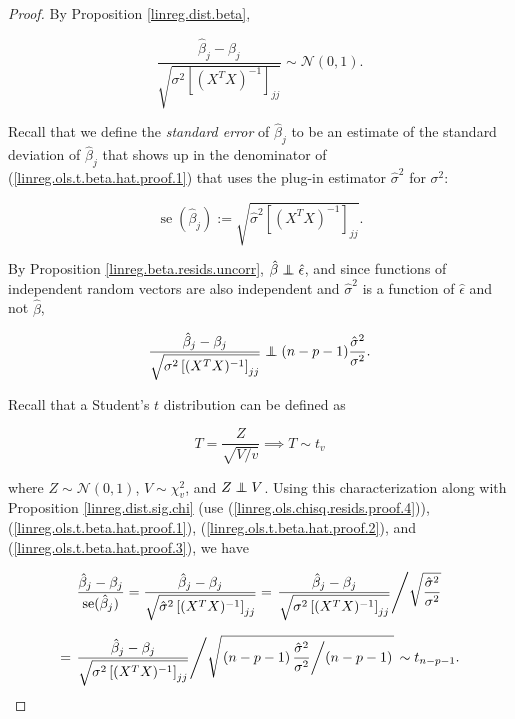 \begin{proof}

By Proposition \ref{linreg.dist.beta},

\begin{equation}\label{linreg.ols.t.beta.hat.proof.1}
\frac{\hat{\beta}_j - \beta_j}{\sqrt{ \sigma^2 \left[ (X^TX)^{-1} \right]_{jj} }}  \sim  \mathcal{N} \left(0, 1 \right).
\end{equation}

Recall that we define the \textit{standard error} of \(\hat{\beta}_j\) to be an estimate of the standard deviation of \(\hat{\beta}_j\) that shows up in the denominator of (\ref{linreg.ols.t.beta.hat.proof.1}) that uses the plug-in estimator \(\hat{\sigma}^2\) for \(\sigma^2\): 

\begin{equation}\label{linreg.ols.t.beta.hat.proof.2}
\operatorname{se}(\hat{\beta}_j) :=  \sqrt{ \hat{\sigma}^2 \left[ (X^TX)^{-1} \right]_{jj} }.
\end{equation}

By Proposition \ref{linreg.beta.resids.uncorr}, \(\hat{\beta} \indep \hat{\epsilon}\), and since functions of independent random vectors are also independent and \(\hat{\sigma}^2\) is a function of \(\hat{\epsilon}\) and not \(\hat{\beta}\), 

\begin{equation}\label{linreg.ols.t.beta.hat.proof.3}
\frac{\hat{\beta}_j - \beta_j}{\sqrt{ \sigma^2 \left[ (X^TX)^{-1} \right]_{jj} }}   \indep (n - p - 1) \frac{ \hat{\sigma}^2}{\sigma^2} .
\end{equation}

Recall that a Student's \(t\) distribution can be defined as

\[
T = \frac{Z}{\sqrt{V/v}} \implies T \sim t_v
\]

where \(Z \sim \mathcal{N}(0,1)\), \(V \sim \chi_v^2\), and \(Z \indep V\). Using this characterization along with Proposition \ref{linreg.dist.sig.chi} (use (\ref{linreg.ols.chisq.resids.proof.4})),(\ref{linreg.ols.t.beta.hat.proof.1}), (\ref{linreg.ols.t.beta.hat.proof.2}), and (\ref{linreg.ols.t.beta.hat.proof.3}), we have

\[
\frac{\hat{\beta}_j - \beta_j}{ \operatorname{se}(\hat{\beta}_j)} = \frac{\hat{\beta}_j - \beta_j}{  \sqrt{ \hat{\sigma}^2 \left[ (X^TX)^{-1} \right]_{jj} } }  
= \left. \frac{\hat{\beta}_j - \beta_j}{\sqrt{ \sigma^2 \left[ (X^TX)^{-1} \right]_{jj} }}  \middle/  \sqrt{ \frac{ \hat{\sigma}^2}{\sigma^2} } \right. 
\]

\[
= \left. \frac{\hat{\beta}_j - \beta_j}{\sqrt{ \sigma^2 \left[ (X^TX)^{-1} \right]_{jj} }}  \middle/   \sqrt{ \left. \left(n - p - 1 \right) \frac{ \hat{\sigma}^2}{\sigma^2} \middle/ (n - p - 1) \right.} \right. 
\sim t_{n - p - 1}.
\]


\end{proof}


